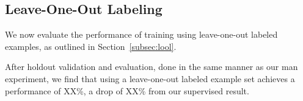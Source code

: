 \subsection{Leave-One-Out Labeling}

We now evaluate the performance of training using leave-one-out labeled
examples, as outlined in Section~\ref{subsec:lool}.

After holdout validation and evaluation, done in the same manner as our man
experiment, we find that using a leave-one-out labeled example set achieves a
performance of XX\%, a drop of XX\% from our supervised result. 
